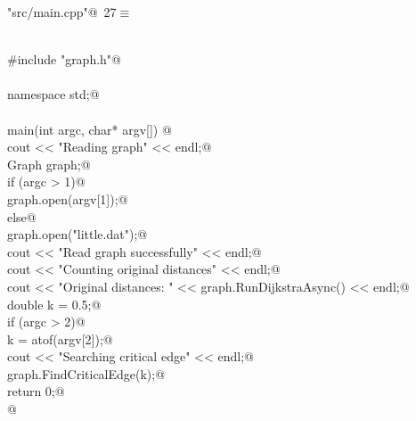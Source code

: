 \documentclass[12pt]{article}
\begin{document}
\begin{flushleft} \small
\begin{minipage}{\linewidth}\label{scrap43}\raggedright\small
{} \verb@"src/main.cpp"@\nobreak\ {\footnotesize {27}}$\equiv$
\vspace{-1ex}
\begin{list}{}{} \item
\mbox{}\verb@@\\
\mbox{}\verb@#include "graph.h"@\\
\mbox{}\verb@@\\
\mbox{}\verb@using namespace std;@\\
\mbox{}\verb@@\\
\mbox{}\verb@int main(int argc, char* argv[]) {@\\
\mbox{}\verb@    cout << "Reading graph" << endl;@\\
\mbox{}\verb@    Graph graph;@\\
\mbox{}\verb@    if (argc > 1)@\\
\mbox{}\verb@        graph.open(argv[1]);@\\
\mbox{}\verb@    else@\\
\mbox{}\verb@        graph.open("little.dat");@\\
\mbox{}\verb@    cout << "Read graph successfully" << endl;@\\
\mbox{}\verb@    cout << "Counting original distances" << endl;@\\
\mbox{}\verb@    cout << "Original distances: " << graph.RunDijkstraAsync() << endl;@\\
\mbox{}\verb@    double k = 0.5;@\\
\mbox{}\verb@    if (argc > 2)@\\
\mbox{}\verb@        k = atof(argv[2]);@\\
\mbox{}\verb@    cout << "Searching critical edge" << endl;@\\
\mbox{}\verb@    graph.FindCriticalEdge(k);@\\
\mbox{}\verb@    return 0;@\\
\mbox{}\verb@}@\\
\mbox{}\verb@@{\NWsep}
\end{list}
\vspace{-1.5ex}
\footnotesize
\begin{list}{}{\setlength{\itemsep}{-\parsep}\setlength{\itemindent}{-\leftmargin}}

\item{}
\end{list}
\end{minipage}\vspace{4ex}
\end{flushleft}
\end{document}
